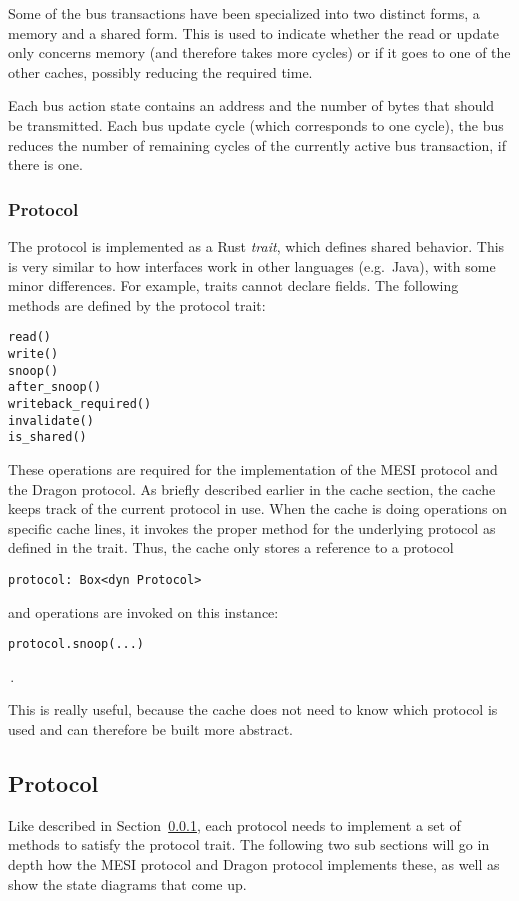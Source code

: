 Some of the bus transactions have been specialized into two distinct forms, a memory and a shared
form. This is used to indicate whether the read or update only concerns memory (and therefore takes
more cycles) or if it goes to one of the other caches, possibly reducing the required time.

Each bus action state contains an address and the number of bytes that should be transmitted. Each
bus update cycle (which corresponds to one cycle), the bus reduces the number of remaining cycles
of the currently active bus transaction, if there is one.

\subsubsection{Protocol}\label{sec:sub_protocol}

The protocol is implemented as a Rust \emph{trait}, which defines shared behavior. This is very
similar to how interfaces work in other languages (e.g.\ Java), with some minor differences. For
example, traits cannot declare fields. The following methods are defined by the protocol trait:
\begin{lstlisting}
read()
write()
snoop()
after_snoop()
writeback_required()
invalidate()
is_shared()
\end{lstlisting}
These operations are required for the implementation of the MESI protocol and the Dragon protocol.
As briefly described earlier in the cache section, the cache keeps track of the current protocol in
use. When the cache is doing operations on specific cache lines, it invokes the proper method for
the underlying protocol as defined in the trait. Thus, the cache only stores a reference to a protocol
\begin{lstlisting}
protocol: Box<dyn Protocol>
\end{lstlisting}
and operations are invoked on this instance:
\begin{lstlisting}
protocol.snoop(...)
\end{lstlisting}
\,.

This is really useful, because the cache does not need to know which protocol is used and can
therefore be built more abstract.

\subsection{Protocol}
Like described in Section~\ref{sec:sub_protocol}, each protocol needs to implement a set of methods
to satisfy the protocol trait. The following two sub sections will go in depth how the MESI protocol and
Dragon protocol implements these, as well as show the state diagrams that come up.

